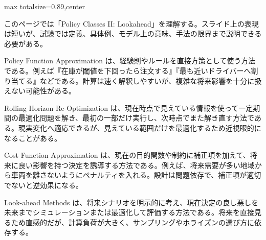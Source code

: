 \begin{minipage}[t]{0.58\textwidth}
\begin{adjustbox}{max totalsize={\textwidth}{0.89\textheight},center}
\begin{minipage}{\textwidth}\scriptsize
{}このページでは「Policy Classes II: Lookahead」を理解する。スライド上の表現は短いが、試験では定義、具体例、モデル上の意味、手法の限界まで説明できる必要がある。\par
Policy Function Approximation は、経験則やルールを直接方策として使う方法である。例えば『在庫が閾値を下回ったら注文する』『最も近いドライバーへ割り当てる』などである。計算は速く解釈しやすいが、複雑な将来影響を十分に扱えない可能性がある。\par
Rolling Horizon Re-Optimization は、現在時点で見えている情報を使って一定期間の最適化問題を解き、最初の一部だけ実行し、次時点でまた解き直す方法である。現実変化へ適応できるが、見えている範囲だけを最適化するため近視眼的になることがある。\par
Cost Function Approximation は、現在の目的関数や制約に補正項を加えて、将来に良い影響を持つ決定を誘導する方法である。例えば、将来需要が多い地域から車両を離さないようにペナルティを入れる。設計は問題依存で、補正項が適切でないと逆効果になる。\par
Look-ahead Methods は、将来シナリオを明示的に考え、現在決定の良し悪しを未来までシミュレーションまたは最適化して評価する方法である。将来を直接見るため直感的だが、計算負荷が大きく、サンプリングやホライズンの選び方に依存する。\par

\end{minipage}
\end{adjustbox}
\end{minipage}
